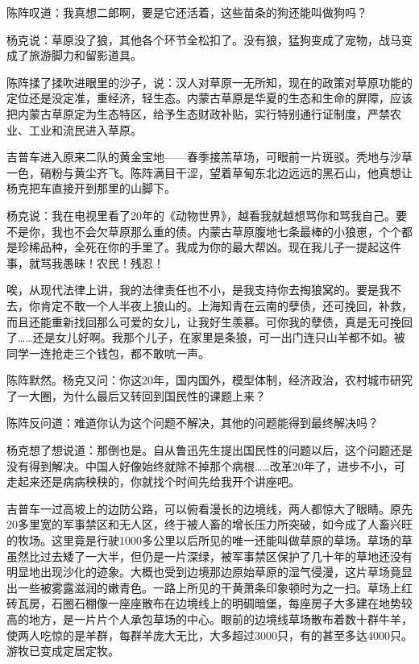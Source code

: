 \par 陈阵叹道：我真想二郎啊，要是它还活着，这些苗条的狗还能叫做狗吗？
\par 杨克说：草原没了狼，其他各个环节全松扣了。没有狼，猛狗变成了宠物，战马变成了旅游脚力和留影道具。
\par 陈阵揉了揉吹进眼里的沙子，说：汉人对草原一无所知，现在的政策对草原功能的定位还是没定准，重经济，轻生态。内蒙古草原是华夏的生态和生命的屏障，应该把内蒙古草原定为生态特区，给予生态财政补贴，实行特别通行证制度，严禁农业、工业和流民进入草原。
\par 吉普车进入原来二队的黄金宝地——春季接羔草场，可眼前一片斑驳。秃地与沙草一色，硝粉与黄尘齐飞。陈阵满目干涩，望着草甸东北边远远的黑石山，他真想让杨克把车直接开到那里的山脚下。
\par 杨克说：我在电视里看了20年的《动物世界》，越看我就越想骂你和骂我自己。要不是你，我也不会欠草原那么重的债。内蒙古草原腹地七条最棒的小狼崽，个个都是珍稀品种，全死在你的手里了。我成为你的最大帮凶。现在我儿子一提起这件事，就骂我愚昧！农民！残忍！
\par 唉，从现代法律上讲，我的法律责任也不小，是我支持你去掏狼窝的。要是我不去，你肯定不敢一个人半夜上狼山的。上海知青在云南的孽债，还可挽回，补救，而且还能重新找回那么可爱的女儿，让我好生羡慕。可你我的孽债，真是无可挽回了……还是女儿好啊。我那个儿子，在家里是条狼，可一出门连只山羊都不如。被同学一连抢走三个钱包，都不敢吭一声。
\par 陈阵默然。杨克又问：你这20年，国内国外，模型体制，经济政治，农村城市研究了一大圈，为什么最后又转回到国民性的课题上来？
\par 陈阵反问道：难道你认为这个问题不解决，其他的问题能得到最终解决吗？
\par 杨克想了想说道：那倒也是。自从鲁迅先生提出国民性的问题以后，这个问题还是没有得到解决。中国人好像始终就除不掉那个病根……改革20年了，进步不小，可走起来还是病病秧秧的，你就找个时间先给我开个讲座吧。
\par 吉普车一过高坡上的边防公路，可以俯看漫长的边境线，两人都惊大了眼睛。原先20多里宽的军事禁区和无人区，终于被人畜的增长压力所突破，如今成了人畜兴旺的牧场。这里竟是行驶1000多公里以后所见的唯一还能叫做草原的草场。草场的草虽然比过去矮了一大半，但仍是一片深绿，被军事禁区保护了几十年的草地还没有明显地出现沙化的迹象。大概也受到边境那边原始草原的湿气侵漫，这片草场竟显出一些被雾露滋润的嫩青色。一路上所见的干黄萧条印象顿时为之一扫。草场上红砖瓦房，石圈石棚像一座座散布在边境线上的明碉暗堡，每座房子大多建在地势较高的地方，是一片片个人承包草场的中心。眼前的边境线草场散布着数十群牛羊，使两人吃惊的是羊群，每群羊庞大无比，大多超过3000只，有的甚至多达4000只。游牧已变成定居定牧。
